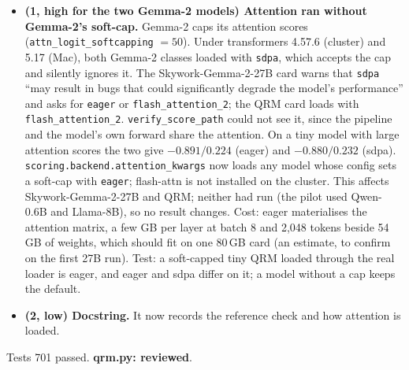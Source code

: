 \documentclass{article}
\begin{document}
\begin{itemize}
  \item \textbf{(1, high for the two Gemma-2 models) Attention ran without Gemma-2's soft-cap.} Gemma-2 caps its
        attention scores (\texttt{attn\_logit\_softcapping} $=50$). Under transformers 4.57.6 (cluster) and 5.17
        (Mac), both Gemma-2 classes loaded with \texttt{sdpa}, which accepts the cap and silently ignores it. The
        Skywork-Gemma-2-27B card warns that \texttt{sdpa} ``may result in bugs that could significantly degrade
        the model's performance'' and asks for \texttt{eager} or \texttt{flash\_attention\_2}; the QRM card loads
        with \texttt{flash\_attention\_2}. \texttt{verify\_score\_path} could not see it, since the pipeline and
        the model's own forward share the attention. On a tiny model with large attention scores the two give
        $-0.891/0.224$ (eager) and $-0.880/0.232$ (sdpa). \texttt{scoring.backend.attention\_kwargs} now loads
        any model whose config sets a soft-cap with \texttt{eager}; flash-attn is not installed on the cluster.
        This affects Skywork-Gemma-2-27B and QRM; neither had run (the pilot used Qwen-0.6B and Llama-8B), so no
        result changes. Cost: eager materialises the attention matrix, a few GB per layer at batch 8 and 2,048
        tokens beside 54\,GB of weights, which should fit on one 80\,GB card (an estimate, to confirm on the first
        27B run). Test: a soft-capped tiny QRM loaded through the real loader is eager, and eager and sdpa differ
        on it; a model without a cap keeps the default.
  \item \textbf{(2, low) Docstring.} It now records the reference check and how attention is loaded.
\end{itemize}
Tests 701 passed. \textbf{qrm.py: reviewed}.
\end{document}
